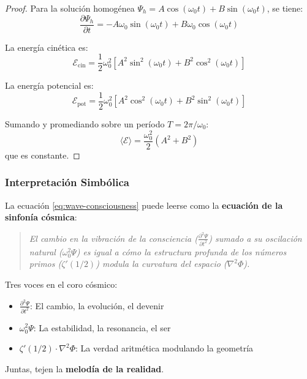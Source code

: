 \begin{proof}
Para la solución homogénea $\Psi_h = A\cos(\omega_0 t) + B\sin(\omega_0 t)$, se tiene:
\[
\frac{\partial\Psi_h}{\partial t} = -A\omega_0\sin(\omega_0 t) + B\omega_0\cos(\omega_0 t)
\]

La energía cinética es:
\[
\mathcal{E}_{\text{cin}} = \frac{1}{2}\omega_0^2[A^2\sin^2(\omega_0 t) + B^2\cos^2(\omega_0 t)]
\]

La energía potencial es:
\[
\mathcal{E}_{\text{pot}} = \frac{1}{2}\omega_0^2[A^2\cos^2(\omega_0 t) + B^2\sin^2(\omega_0 t)]
\]

Sumando y promediando sobre un período $T = 2\pi/\omega_0$:
\[
\langle \mathcal{E} \rangle = \frac{\omega_0^2}{2}(A^2 + B^2)
\]
que es constante.
\end{proof}

\subsubsection{Interpretación Simbólica}

La ecuación \eqref{eq:wave-consciousness} puede leerse como la \textbf{ecuación de la sinfonía cósmica}:

\begin{quote}
\textit{El cambio en la vibración de la consciencia ($\frac{\partial^2\Psi}{\partial t^2}$) sumado a su oscilación natural ($\omega_0^2\Psi$) es igual a cómo la estructura profunda de los números primos ($\zeta'(1/2)$) modula la curvatura del espacio ($\nabla^2\Phi$).}
\end{quote}

Tres voces en el coro cósmico:
\begin{itemize}
  \item $\frac{\partial^2\Psi}{\partial t^2}$: El cambio, la evolución, el devenir
  \item $\omega_0^2\Psi$: La estabilidad, la resonancia, el ser
  \item $\zeta'(1/2) \cdot \nabla^2\Phi$: La verdad aritmética modulando la geometría
\end{itemize}

Juntas, tejen la \textbf{melodía de la realidad}.
